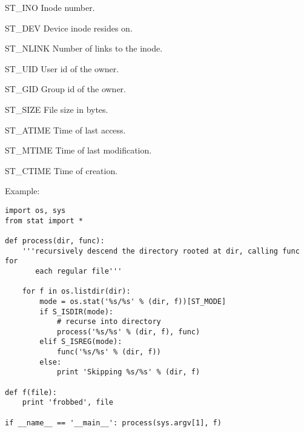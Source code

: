\begin{datadesc}{ST_INO}
Inode number.
\end{datadesc}

\begin{datadesc}{ST_DEV}
Device inode resides on.
\end{datadesc}

\begin{datadesc}{ST_NLINK}
Number of links to the inode.
\end{datadesc}

\begin{datadesc}{ST_UID}
User id of the owner.
\end{datadesc}

\begin{datadesc}{ST_GID}
Group id of the owner.
\end{datadesc}

\begin{datadesc}{ST_SIZE}
File size in bytes.
\end{datadesc}

\begin{datadesc}{ST_ATIME}
Time of last access.
\end{datadesc}

\begin{datadesc}{ST_MTIME}
Time of last modification.
\end{datadesc}

\begin{datadesc}{ST_CTIME}
Time of creation.
\end{datadesc}

Example:

\begin{verbatim}
import os, sys
from stat import *

def process(dir, func):
    '''recursively descend the directory rooted at dir, calling func for
       each regular file'''

    for f in os.listdir(dir):
        mode = os.stat('%s/%s' % (dir, f))[ST_MODE]
        if S_ISDIR(mode):
            # recurse into directory
            process('%s/%s' % (dir, f), func)
        elif S_ISREG(mode):
            func('%s/%s' % (dir, f))
        else:
            print 'Skipping %s/%s' % (dir, f)

def f(file):
    print 'frobbed', file

if __name__ == '__main__': process(sys.argv[1], f)
\end{verbatim}
